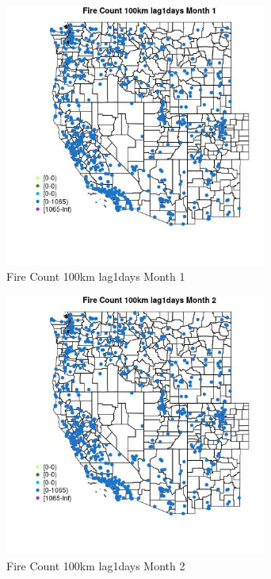 \begin{figure} 
\centering  
\includegraphics[width=0.77\textwidth]{Code_Outputs/Report_ML_input_PM25_Step4_part_f_de_duplicated_aveswNAs_MapObsMo1Fire_Count_100km_lag1days.jpg} 
\caption{\label{fig:Report_ML_input_PM25_Step4_part_f_de_duplicated_aveswNAsMapObsMo1Fire_Count_100km_lag1days}Fire Count 100km lag1days Month 1} 
\end{figure} 
 

\begin{figure} 
\centering  
\includegraphics[width=0.77\textwidth]{Code_Outputs/Report_ML_input_PM25_Step4_part_f_de_duplicated_aveswNAs_MapObsMo2Fire_Count_100km_lag1days.jpg} 
\caption{\label{fig:Report_ML_input_PM25_Step4_part_f_de_duplicated_aveswNAsMapObsMo2Fire_Count_100km_lag1days}Fire Count 100km lag1days Month 2} 
\end{figure} 
 

